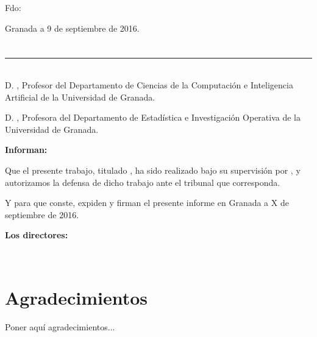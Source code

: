 \vspace{6cm}

\noindent Fdo: \myName

\vspace{2cm}

\begin{flushright}
Granada a 9 de septiembre de 2016.
\end{flushright}


\chapter*{}
\thispagestyle{empty}

\noindent\rule[-1ex]{\textwidth}{2pt}\\[4.5ex]

D. \textbf{ \myProf }, Profesor del Departamento de Ciencias de la Computación e Inteligencia Artificial de la Universidad de Granada.

\vspace{0.5cm}

D. \textbf{ \myOtherProf}, Profesora del Departamento de Estadística e Investigación Operativa de la Universidad de Granada.


\vspace{0.5cm}

\textbf{Informan:}

\vspace{0.5cm}

Que el presente trabajo, titulado \textit{\textbf{\myTitle}},
ha sido realizado bajo su supervisión por \textbf{\myName}, y autorizamos la defensa de dicho trabajo ante el tribunal
que corresponda.

\vspace{0.5cm}

Y para que conste, expiden y firman el presente informe en Granada a X de septiembre de 2016.

\vspace{1cm}

\textbf{Los directores:}

\vspace{5cm}

\noindent \textbf{\myProf \ \ \ \ \ \myOtherProf}

\chapter*{Agradecimientos}
\thispagestyle{empty}

       \vspace{1cm}


Poner aquí agradecimientos...

